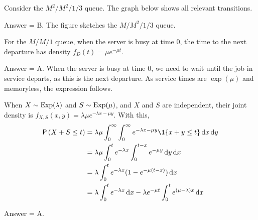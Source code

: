 \begin{exercise}[201804]
 Consider the $M^2/M^2/1/3$ queue. The graph below shows all relevant transitions.

 \begin{center}
 \end{center}
\begin{solution}
Answer = B. The figure sketches the $M/M^2/1/3$ queue.
\end{solution}
\end{exercise}

\begin{exercise}[201804]
For the $M/M/1$ queue, when the server is busy at time $0$, the time to the next departure has density $f_D(t) = \mu e^{-\mu t}$.
\begin{solution}
Answer = A. When the server is busy at time $0$, we need to wait until the job in service departs, as this is the next departure. As service times are $\exp(\mu)$ and memoryless, the expression follows.
\end{solution}
\end{exercise}

\begin{exercise}[201804]
When $X\sim \operatorname{Exp}(\lambda)$ and $S\sim\operatorname{Exp}(\mu)$, and $X$ and $S$ are independent, their joint density is $f_{X,S}(x,y) = \lambda \mu e^{-\lambda x - \mu y}$. With this,
 \begin{align*}
\P{X+S\leq t } 
&= \lambda \mu \int_0^\infty \int_0^\infty e^{-\lambda x - \mu y} \1{x+y\leq t} \d x \d y \\
&= \lambda \mu \int_0^t e^{-\lambda x} \int_0^{t-x} e^{- \mu y} \d y \d x \\
&= \lambda \int_0^t e^{-\lambda x} (1-e^{- \mu (t-x)} ) \d x \\
&= \lambda \int_0^t e^{-\lambda x} \d x - \lambda e^{-\mu t} \int_0^t e^{(\mu-\lambda) x} \d x \\
 \end{align*}
\begin{solution}
Answer = A.
\end{solution}
\end{exercise}

